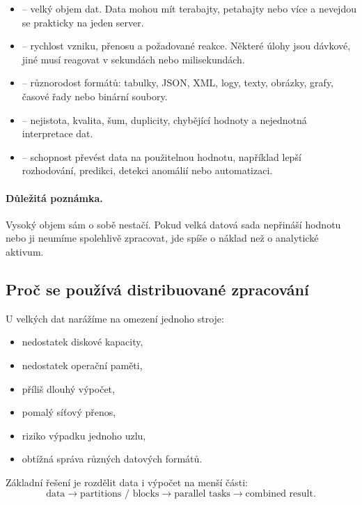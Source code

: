 \begin{itemize}
    \item {} -- velký objem dat. Data mohou mít terabajty, petabajty nebo více a nevejdou se
    prakticky na jeden server.
    \item {} -- rychlost vzniku, přenosu a požadované reakce. Některé úlohy jsou dávkové,
    jiné musí reagovat v sekundách nebo milisekundách.
    \item {} -- různorodost formátů: tabulky, JSON, XML, logy, texty, obrázky, grafy,
    časové řady nebo binární soubory.
    \item {} -- nejistota, kvalita, šum, duplicity, chybějící hodnoty a nejednotná
    interpretace dat.
    \item {} -- schopnost převést data na použitelnou hodnotu, například lepší rozhodování,
    predikci, detekci anomálií nebo automatizaci.
\end{itemize}

\paragraph{Důležitá poznámka.}
Vysoký objem sám o sobě nestačí. Pokud velká datová sada nepřináší hodnotu nebo ji neumíme spolehlivě
zpracovat, jde spíše o náklad než o analytické aktivum.

\subsection{Proč se používá distribuované zpracování}

U velkých dat narážíme na omezení jednoho stroje:
\begin{itemize}
    \item nedostatek diskové kapacity,
    \item nedostatek operační paměti,
    \item příliš dlouhý výpočet,
    \item pomalý síťový přenos,
    \item riziko výpadku jednoho uzlu,
    \item obtížná správa různých datových formátů.
\end{itemize}

Základní řešení je rozdělit data i výpočet na menší části:
\[
\text{data}
\rightarrow
\text{partitions / blocks}
\rightarrow
\text{parallel tasks}
\rightarrow
\text{combined result}.
\]

